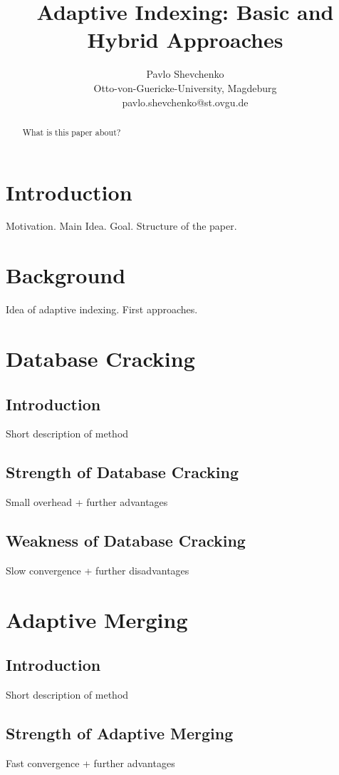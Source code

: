 \documentclass[10pt, conference, compsocconf]{IEEEtran}
\begin{document}
\title{Adaptive Indexing: Basic and Hybrid Approaches}
\author{Pavlo Shevchenko \\ Otto-von-Guericke-University, Magdeburg \\ pavlo.shevchenko@st.ovgu.de}

\maketitle

\begin{abstract}
What is this paper about?
\end{abstract}

\section{Introduction}
Motivation. Main Idea. Goal. Structure of the paper.

\section{Background}
Idea of adaptive indexing. First approaches.

\section{Database Cracking}
\subsection{Introduction}
Short description of method 
\subsection{Strength of Database Cracking}
Small overhead + further advantages
\subsection{Weakness of Database Cracking}
Slow convergence + further disadvantages

\section{Adaptive Merging}
\subsection{Introduction}
Short description of method
\subsection{Strength of Adaptive Merging}
Fast convergence + further advantages
\end{document}
